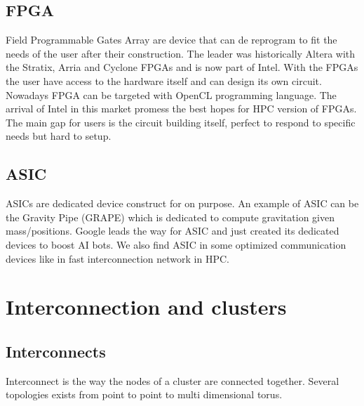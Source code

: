 \subsection{FPGA}
Field Programmable Gates Array are device that can de reprogram to fit the needs of the user after their construction.
The leader was historically Altera with the Stratix, Arria and Cyclone FPGAs and is now part of Intel. 
With the FPGAs the user have access to the hardware itself and can design its own circuit. 
Nowadays FPGA can be targeted with OpenCL programming language. 
The arrival of Intel in this market promess the best hopes for HPC version of FPGAs. 
The main gap for users is the circuit building itself, perfect to respond to specific needs but hard to setup. 

\subsection{ASIC}
ASICs are dedicated device construct for on purpose. 
An example of ASIC can be the Gravity Pipe (GRAPE) which is dedicated to compute gravitation given mass/positions.
Google leads the way for ASIC and just created its dedicated devices to boost AI bots.
We also find ASIC in some optimized communication devices like in fast interconnection network in HPC.  

\section{Interconnection and clusters}

\subsection{Interconnects}
Interconnect is the way the nodes of a cluster are connected together. 
Several topologies exists from point to point to multi dimensional torus.


